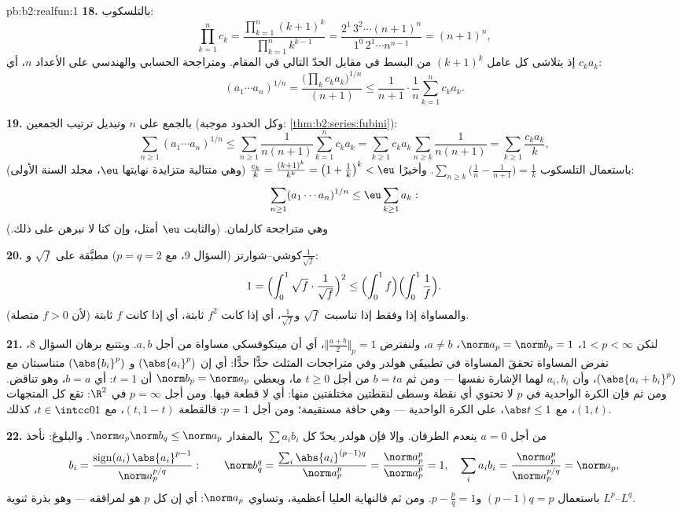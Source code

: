 \begin{solution}{pb:b2:realfun:1}
\textbf{18.} بالتلسكوب:
\[
\prod_{k=1}^{n}c_k = \frac{\prod_{k=1}^n(k+1)^k}
{\prod_{k=1}^{n}k^{k-1}}
= \frac{2^1\,3^2\cdots(n+1)^n}{1^0\,2^1\cdots n^{n-1}}
= (n+1)^n,
\]
إذ يتلاشى كل عامل $(k+1)^k$ من البسط في مقابل الحدّ التالي
في المقام. ومتراجحة الحسابي والهندسي على الأعداد $n$، أي $c_ka_k$:
\[
(a_1\cdots a_n)^{1/n} =
\frac{\bigl(\prod_k c_ka_k\bigr)^{1/n}}{(n+1)}
\leq \frac{1}{n+1}\cdot\frac1n\sum_{k=1}^{n}c_ka_k .
\]

\textbf{19.} بالجمع على $n$ وتبديل ترتيب الجمعين
(وكل الحدود موجبة: \cref{thm:b2:series:fubini}):
\[
\sum_{n\geq1}(a_1\cdots a_n)^{1/n}
\leq \sum_{n\geq1}\frac{1}{n(n+1)}\sum_{k=1}^{n}c_ka_k
= \sum_{k\geq1}c_ka_k\sum_{n\geq k}\frac1{n(n+1)}
= \sum_{k\geq1}\frac{c_ka_k}{k},
\]
باستعمال التلسكوب $\sum_{n\geq k}\bigl(\frac1n -
\frac1{n+1}\bigr) = \frac1k$. وأخيرًا $\frac{c_k}k =
\frac{(k+1)^k}{k^k} = \bigl(1 + \frac1k\bigr)^k < \eu$
(وهي متتالية متزايدة نهايتها $\eu$، مجلد السنة الأولى):
\[
\sum_{n\geq1}(a_1\cdots a_n)^{1/n} \leq
\eu\sum_{k\geq1}a_k :
\]
وهي متراجحة كارلمان. (والثابت $\eu$ أمثل، وإن كنا
لا نبرهن على ذلك.)

\textbf{20.} كوشي--شوارتز (السؤال 9، مع $p = q = 2$) مطبَّقة
على $\sqrt f$ و$\frac1{\sqrt f}$:
\[
1 = \Bigl(\int_0^1\sqrt f\cdot\frac{1}{\sqrt f}\Bigr)^{2}
\leq \Bigl(\int_0^1 f\Bigr)\Bigl(\int_0^1\frac1f\Bigr).
\]
والمساواة إذا وفقط إذا تناسبت $\sqrt f$ و$\frac1{\sqrt f}$،
أي إذا كانت $f^2$ ثابتة، أي إذا كانت $f$ ثابتة (لأن $f > 0$ متصلة).

\textbf{21.} لتكن $1 < p < \infty$، $\norm a_p = \norm b_p = 1$،
$a \neq b$، ولنفترض $\bigl\Vert\frac{a+b}2\bigr\Vert_p = 1$،
أي أن مينكوفسكي مساواة من أجل $a, b$. وبتتبع برهان السؤال 8،
تفرض المساواة تحققَ المساواة في تطبيقَي هولدر
وفي متراجحات المثلث حدًّا حدًّا: أي إن $(\abs{a_i}^p)$ و
$(\abs{b_i}^p)$ متناسبتان مع $(\abs{a_i + b_i}^p)$، وأن
$a_i, b_i$ لهما الإشارة نفسها --- ومن ثم $b = ta$ من أجل $t \geq
0$ ما، ويعطي $\norm b_p = \norm a_p$ أن $t = 1$: أي $b = a$،
وهو تناقض. ومن ثم فإن الكرة الواحدية في $p$ لا تحتوي أي نقطة وسطى
لنقطتين مختلفتين منها: أي لا قطعة فيها. ومن أجل $p = \infty$ في $\R^2$:
تقع كل المتجهات $(1, t)$، مع $\abs t \leq 1$، على الكرة الواحدية --- وهي حافة
مستقيمة؛ ومن أجل $p = 1$: فالقطعة $(t, 1 - t)$، مع $t \in \intcc01$،
كذلك.

\textbf{22.} من أجل $a = 0$ ينعدم الطرفان. وإلا فإن هولدر
يحدّ كل $\sum a_ib_i$ بالمقدار $\norm a_p\norm b_q \leq \norm
a_p$. والبلوغ: نأخذ
\[
b_i = \frac{\operatorname{sign}(a_i)\,\abs{a_i}^{p-1}}
{\norm a_p^{p/q}} :
\qquad
\norm b_q^q = \frac{\sum_i\abs{a_i}^{(p-1)q}}{\norm a_p^{p}}
= \frac{\norm a_p^p}{\norm a_p^p} = 1,
\quad
\sum_ia_ib_i = \frac{\norm a_p^p}{\norm a_p^{p/q}} =
\norm a_p ,
\]
باستعمال $(p-1)q = p$ و$p - \frac pq = 1$. ومن ثم فالنهاية العليا
أعظمية، وتساوي $\norm a_p$: أي إن كل  $p$ هو  
لمرافقه --- وهو بذرة ثنوية $L^p$--$L^q$.


\end{solution}
